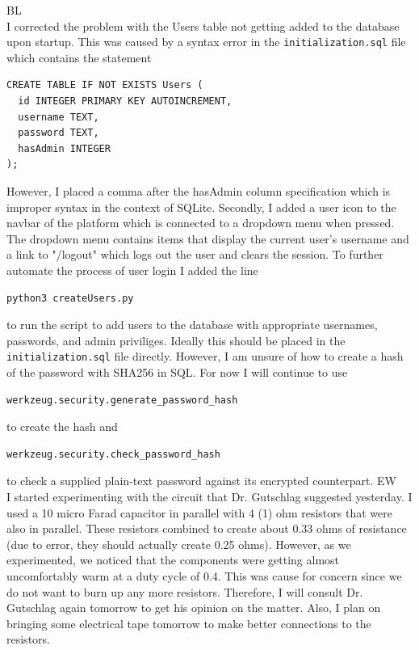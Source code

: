 \documentclass[fontsize=11pt, %
                             paper=letter, %
                             openany, %
                             captions=tableheading,
                             index=totoc,
                             hyperref]{labbook}
\begin{document}
BL\\
I corrected the problem with the Users table not getting added to the database upon startup. This was caused by a syntax error in the \texttt{initialization.sql} file which contains the statement 
\begin{Verbatim}
CREATE TABLE IF NOT EXISTS Users (
  id INTEGER PRIMARY KEY AUTOINCREMENT,
  username TEXT,
  password TEXT,
  hasAdmin INTEGER
);
\end{Verbatim}
However, I placed a comma after the hasAdmin column specification which is improper syntax in the context of SQLite. Secondly, I added a user icon to the navbar of the platform which is connected to a dropdown menu when pressed. The dropdown menu contains items that display the current user's username and a link to "/logout" which logs out the user and clears the session. To further automate the process of user login I added the line
\begin{Verbatim}
python3 createUsers.py
\end{Verbatim}
to run the script to add users to the database with appropriate usernames, passwords, and admin priviliges. Ideally this should be placed in the \texttt{initialization.sql} file directly. However, I am unsure of how to create a hash of the password with SHA256 in SQL. For now I will continue to use
\begin{Verbatim}
werkzeug.security.generate_password_hash
\end{Verbatim}
to create the hash and
\begin{Verbatim}
werkzeug.security.check_password_hash
\end{Verbatim}
to check a supplied plain-text password against its encrypted counterpart.
\medbreak\noindent
EW\\
I started experimenting with the circuit that Dr. Gutschlag suggested yesterday. I used a 10 micro Farad capacitor in parallel with 4 (1) ohm resistors that were also in parallel. These resistors combined to create about 0.33 ohms of resistance (due to error, they should actually create 0.25 ohms). However, as we experimented, we noticed that the components were getting almost uncomfortably warm at a duty cycle of 0.4. This was cause for concern since we do not want to burn up any more resistors. Therefore, I will consult Dr. Gutschlag again tomorrow to get his opinion on the matter. Also, I plan on bringing some electrical tape tomorrow to make better connections to the resistors.
\end{document}
